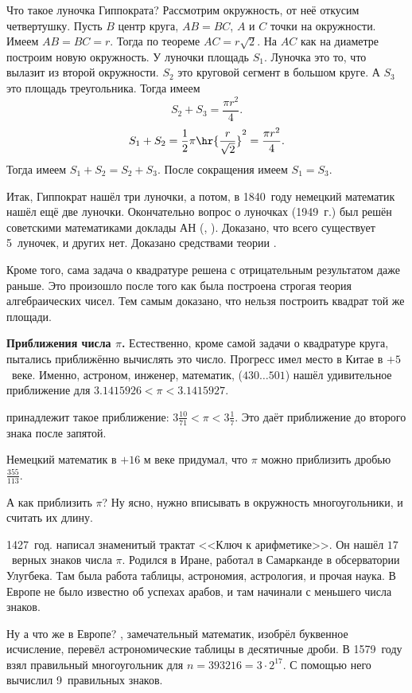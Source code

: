 \documentclass[a4paper,oneside,fleqn,10pt]{article}
\newcommand{\pe}[2]{${#1}\ldots{#2}$}
\newcommand{\cpic}[1]{$$\epsfbox{pictures.#1}$$}
\begin{document}
Что такое луночка Гиппократа? Рассмотрим окружность, от неё откусим четвертушку.
Пусть $B$ центр круга, $AB= BC$, $A$ и $C$ точки на окружности.
Имеем $AB = BC = r$. Тогда по теореме  $AC = r\sqrt2$.
На $AC$ как на диаметре построим новую окружность. У луночки площадь $S_1$.
Луночка это то, что вылазит из второй окружности. $S_2$ это круговой сегмент
в большом круге. А $S_3$ это площадь треугольника. Тогда имеем
$$S_2 + S_3 = \frac{\pi r^2}{4}.$$
$$S_1 + S_2 = \frac12 \pi \hr{\frac{r}{\sqrt2}}^2 = \frac{\pi r^2}{4}.$$
Тогда имеем $S_1 + S_2 = S_2 + S_3$. После сокращения имеем
$S_1 = S_3$.

Итак, Гиппократ нашёл три луночки, а потом, в 1840~году
немецкий математик  нашёл ещё две луночки.
Окончательно вопрос о луночках (1949~г.) был решён советскими
математиками доклады АН (, ).
Доказано, что всего существует 5~луночек, и других нет.
Доказано средствами теории .

Кроме того, сама задача о квадратуре решена с отрицательным результатом даже раньше.
Это произошло после того как была построена строгая теория алгебраических чисел. Тем самым доказано, что нельзя
построить квадрат той же площади.

\textbf{Приближения числа $\pi$.}
Естественно, кроме самой задачи о квадратуре круга, пытались приближённо вычислять
это число. Прогресс имел место в Китае в $+5$~веке. Именно, астроном, инженер, математик,
 (\pe{430}{501})
нашёл удивительное приближение для $3.1415926 < \pi < 3.1415927$.

 принадлежит такое приближение:
$3\frac{10}{71} < \pi < 3 \frac{1}{7}$.
Это даёт приближение до второго знака после запятой.

Немецкий математик  в $+16$ м веке придумал, что
$\pi$ можно приблизить дробью $\frac{355}{113}$.

А как приблизить $\pi$? Ну ясно, нужно вписывать в окружность многоугольники, и считать их длину.

1427~год.  написал  знаменитый трактат <<Ключ к арифметике>>. Он нашёл $17$~верных знаков числа $\pi$.
Родился в Иране, работал в Самарканде в обсерватории Улугбека. Там была работа таблицы,
астрономия, астрология, и прочая наука. В Европе не было известно об успехах арабов, и там начинали с
меньшего числа знаков.

Ну а что же в Европе? , замечательный математик, изобрёл буквенное исчисление,
перевёл  астрономические таблицы в десятичные дроби. В 1579~году взял правильный
многоугольник для $n = 393216 = 3\cdot 2^{17}$.
С помощью него вычислил 9~правильных знаков.
\end{document}
